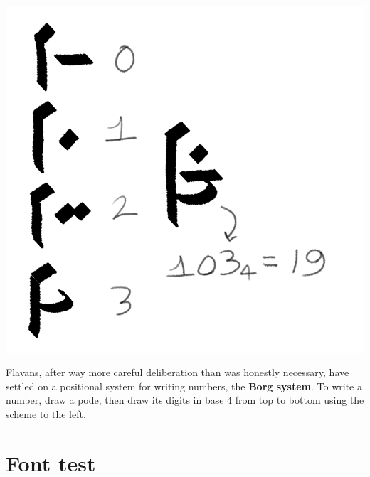 \documentclass[10pt,oneside]{memoir}
\begin{document}
\vfill


\vspace{-50pt}

\begin{minipage}[]{0.45\textwidth}
    \centering
    \includegraphics{digits}
\end{minipage}
\hfill
\begin{minipage}[]{0.5\textwidth}
    Flavans, after way more careful deliberation than was honestly necessary, have settled on a positional system for writing numbers, the \textbf{Borg system}. To write a number, draw a pode, then draw its digits in base $4$ from top to bottom using the scheme to the left.
\end{minipage}



\vfill

\pagebreak

\section{Font test}

{\Large
    \begin{tabular}[]{*{5}{c|}}
        
    \end{tabular}

}
\end{document}
